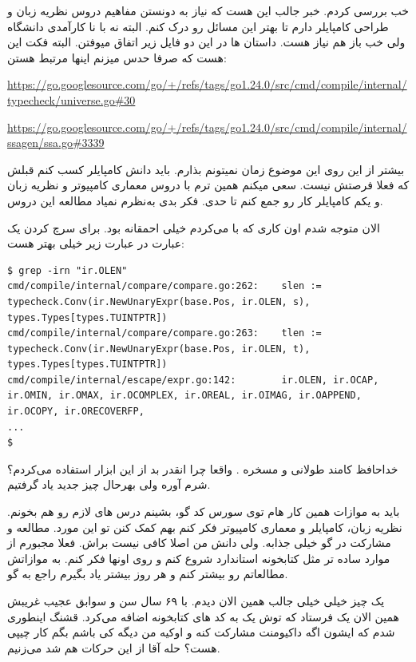 خب بررسی کردم. خبر جالب این هست که نیاز به دونستن مفاهیم دروس نظریه زبان و طراحی کامپایلر دارم تا بهتر این مسائل رو درک کنم.
البته نه با نا کارآمدی دانشگاه ولی خب باز هم نیاز هست. داستان ها در این دو فایل زیر اتفاق میوفتن. البته فکت این هست که صرفا حدس میزنم
اینها مرتبط هستن:

\begin{latin}
\url{https://go.googlesource.com/go/+/refs/tags/go1.24.0/src/cmd/compile/internal/typecheck/universe.go#30}

\url{https://go.googlesource.com/go/+/refs/tags/go1.24.0/src/cmd/compile/internal/ssagen/ssa.go#3339}
\end{latin}

بیشتر از این روی این موضوع زمان نمیتونم بذارم. باید دانش کامپایلر کسب کنم قبلش که فعلا فرصتش نیست. سعی میکنم همین ترم
با دروس معماری کامپیوتر و نظریه زبان و یکم کامپایلر کار رو جمع کنم تا حدی. فکر بدی به‌نظرم نمیاد مطالعه این دروس.

الان متوجه شدم اون کاری که با  می‌کردم خیلی احمقانه بود. برای سرچ کردن یک عبارت در  عبارت زیر خیلی بهتر هست:
\begin{latin}
\begin{verbatim}
$ grep -irn "ir.OLEN"
cmd/compile/internal/compare/compare.go:262:    slen := typecheck.Conv(ir.NewUnaryExpr(base.Pos, ir.OLEN, s), types.Types[types.TUINTPTR])
cmd/compile/internal/compare/compare.go:263:    tlen := typecheck.Conv(ir.NewUnaryExpr(base.Pos, ir.OLEN, t), types.Types[types.TUINTPTR])
cmd/compile/internal/escape/expr.go:142:        ir.OLEN, ir.OCAP, ir.OMIN, ir.OMAX, ir.OCOMPLEX, ir.OREAL, ir.OIMAG, ir.OAPPEND, ir.OCOPY, ir.ORECOVERFP,
...
$
\end{verbatim}
\end{latin}

خداحافظ کامند طولانی و مسخره . واقعا چرا انقدر بد از این ابزار استفاده می‌کردم؟ شرم آوره ولی بهرحال چیز جدید یاد گرفتیم.

باید به موازات همین کار هام توی سورس کد گو، بشینم درس های لازم رو هم بخونم. نظریه زبان، کامپایلر و معماری کامپیوتر فکر کنم بهم کمک کنن
تو این مورد. مطالعه و مشارکت در  گو خیلی جذابه. ولی دانش من اصلا کافی نیست براش. فعلا مجبورم از موارد ساده تر مثل کتابخونه استاندارد
شروع کنم و روی اونها فکر کنم. به موازاتش مطالعاتم رو بیشتر کنم و هر روز بیشتر یاد بگیرم راجع به  گو.

یک چیز خیلی خیلی جالب همین الان دیدم.  با ۶۹ سال سن و سوابق عجیب غریبش همین الان یک \cl فرستاد که توش یک 
به کد های کتابخونه  اضافه می‌کرد. قشنگ اینطوری شدم که ایشون اگه داکیومنت مشارکت کنه و اوکیه من دیگه کی باشم بگم کار چیپی هست؟
حله آقا از این حرکات هم شد می‌زنیم.

